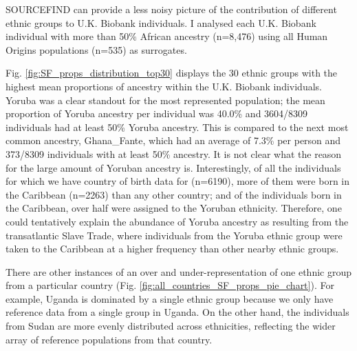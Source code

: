 SOURCEFIND can provide a less noisy picture of the contribution of different ethnic groups to U.K. Biobank individuals. I analysed each U.K. Biobank individual with more than 50\% African ancestry (n=8,476) using all Human Origins populations (n=535) as surrogates. 

Fig. \ref{fig:SF_props_distribution_top30} displays the 30 ethnic groups with the highest mean proportions of ancestry within the U.K. Biobank individuals. Yoruba was a clear standout for the most represented population; the mean proportion of Yoruba ancestry per individual was 40.0\% and 3604/8309 individuals had at least 50\% Yoruba ancestry. This is compared to the next most common ancestry, Ghana\_Fante, which had an average of 7.3\% per person and 373/8309 individuals with at least 50\% ancestry. It is not clear what the reason for the large amount of Yoruban ancestry is. Interestingly, of all the individuals for which we have country of birth data for (n=6190), more of them were born in the Caribbean (n=2263) than any other country; and of the individuals born in the Caribbean, over half were assigned to the Yoruban ethnicity. Therefore, one could tentatively explain the abundance of Yoruba ancestry as resulting from the transatlantic Slave Trade, where individuals from the Yoruba ethnic group were taken to the Caribbean at a higher frequency than other nearby ethnic groups.  

There are other instances of an over and under-representation of one ethnic group from a particular country (Fig. \ref{fig:all_countries_SF_props_pie_chart}). For example, Uganda is dominated by a single ethnic group because we only have reference data from a single group in Uganda. On the other hand, the individuals from Sudan are more evenly distributed across ethnicities, reflecting the wider array of reference populations from that country. 

